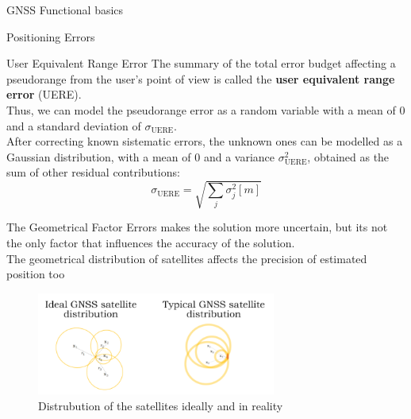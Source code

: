 \begin{section}{GNSS Functional basics}
\begin{section}{Positioning Errors}
      \begin{subsection}{User Equivalent Range Error}
        The summary of the total error budget affecting a pseudorange from the user's point of view 
        is called the \textbf{user equivalent range error} (UERE).\\
        Thus, we can model the pseudorange error as a random variable with a mean of $0$ and a standard
        deviation of $\sigma_{\text{UERE}}$.\\
        After correcting known sistematic errors, the unknown ones can be modelled as a Gaussian 
        distribution, with a mean of $0$ and a variance $\sigma_{\text{UERE}}^2$, obtained as the sum
        of other residual contributions:
        \begin{equation}
          \sigma_{\text{UERE}} = \sqrt{\sum_{j} \sigma^2_j [m]}
        \label{eq:GNSS UERE}
      \end{equation}
      \end{subsection}

      \begin{subsection}{The Geometrical Factor}
        Errors makes the solution more uncertain, but its not the only factor that influences the
        accuracy of the solution.\\
        The geometrical distribution of satellites affects the precision of estimated position too

        \begin{figure}[h]
          \centering
          \includegraphics[width=0.7\textwidth]{img/wireless/satellite distibution.png}
          \caption{Distrubution of the satellites ideally and in reality}
          \label{fig:GNSS geometry}
        \end{figure}


\end{subsection}
\end{section}
\end{section}
